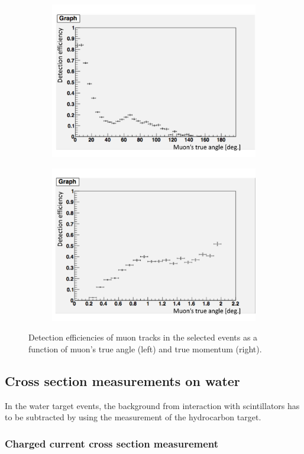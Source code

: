 \begin{figure}[tbh]
  \begin{center}
   \begin{subfigure}{0.48\textwidth}
     \includegraphics[width=\linewidth]{fig/eff_muon_angle_neutrino.pdf}
    \end{subfigure}
  \begin{subfigure}{0.48\textwidth}
      \includegraphics[width=\linewidth]{fig/eff_muon_momentum_neutrino.pdf}
    \end{subfigure}    
    \end{center}
  \caption{
Detection efficiencies of muon tracks in the selected events as a function of muon's true angle (left) and true momentum (right).
}
\label{fig:eff_muon_angle_momentum_neutrino}
\end{figure}


\subsection{Cross section measurements on water}
In the water target events, the background from interaction with scintillators has to be subtracted by using the measurement of the hydrocarbon target.


\subsubsection{Charged current cross section measurement}


